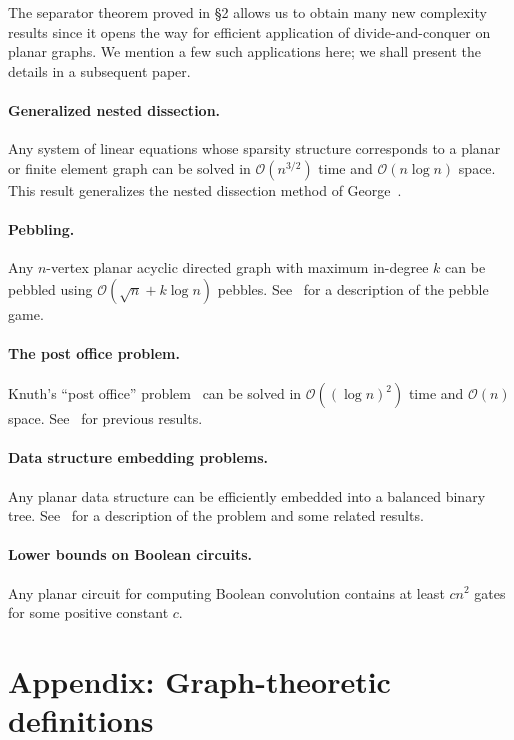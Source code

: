 \documentclass[12pt]{article}
\theoremstyle{remark}
\newcommand{\bigO}{\mathcal{O}}
\begin{document}
The separator theorem proved in \S2 allows us to obtain many new complexity results
since it opens the way for efficient application of divide-and-conquer on planar
graphs. We mention a few such applications here; we shall present the details in a
subsequent paper.

\paragraph{Generalized nested dissection.} Any system of linear equations whose
sparsity structure corresponds to a planar or finite element graph can be solved in
$\bigO(n^{3/2})$ time and $\bigO(n \log n)$ space. This result generalizes the nested
dissection method of George~\cite{george73}.

\paragraph{Pebbling.} Any $n$-vertex planar acyclic directed graph with maximum
in-degree $k$ can be pebbled using $\bigO(\sqrt{n} + k\log n)$ pebbles.
See~\cite{hopcroft77,paul77} for a description of the pebble game.

\paragraph{The post office problem.} Knuth's ``post office'' problem~\cite{knuth73}
can be solved in $\bigO((\log n)^2)$ time and $\bigO(n)$ space. See~\cite{dobkin76,shamos}
for previous results.

\paragraph{Data structure embedding problems.} Any planar data structure can be
efficiently embedded into a balanced binary tree. See~\cite{demillo76,lipton76} for a
description of the problem and some related results.

\paragraph{Lower bounds on Boolean circuits.} Any planar circuit for computing
Boolean convolution contains at least $cn^2$ gates for some positive constant $c$.

\section*{Appendix: Graph-theoretic definitions}
\end{document}
